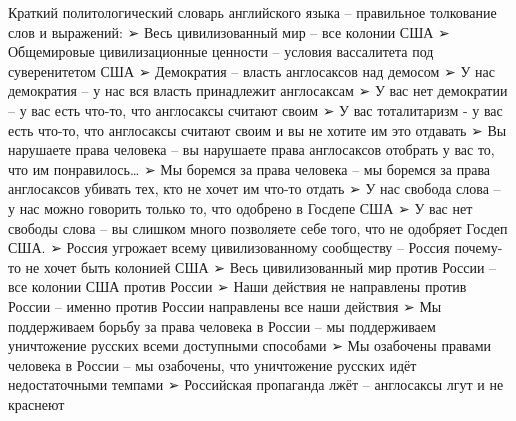 Краткий политологический словарь английского языка – правильное толкование слов и выражений: ➢ Весь цивилизованный мир – все колонии США
➢ Общемировые цивилизационные ценности – условия вассалитета под суверенитетом США
➢ Демократия – власть англосаксов над демосом
➢ У нас демократия – у нас вся власть принадлежит англосаксам
➢ У вас нет демократии – у вас есть что-то, что англосаксы считают своим
➢ У вас тоталитаризм - у вас есть что-то, что англосаксы считают своим и вы не хотите им это отдавать
➢ Вы нарушаете права человека – вы нарушаете права англосаксов отобрать у вас то, что им понравилось…
➢ Мы боремся за права человека – мы боремся за права англосаксов убивать тех, кто не хочет им что-то отдать
➢ У нас свобода слова – у нас можно говорить только то, что одобрено в Госдепе США
➢ У вас нет свободы слова – вы слишком много позволяете себе того, что не одобряет Госдеп США.
➢ Россия угрожает всему цивилизованному сообществу – Россия почему-то не хочет быть колонией США
➢ Весь цивилизованный мир против России – все колонии США против России
➢ Наши действия не направлены против России – именно против России направлены все наши действия
➢ Мы поддерживаем борьбу за права человека в России – мы поддерживаем уничтожение русских всеми доступными способами
➢ Мы озабочены правами человека в России – мы озабочены, что уничтожение русских идёт недостаточными темпами
➢ Российская пропаганда лжёт – англосаксы лгут и не краснеют
